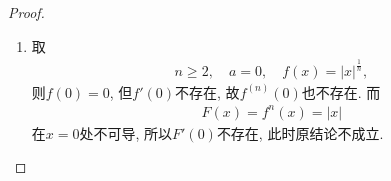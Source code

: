 \documentclass[../../main.tex]{subfiles}%
\begin{document}
\begin{proof}
\begin{enumerate}[(1)]
{\color{blue}证法二:} 由\hyperref[theorem:带各种余项的Taylor公式]{带Peano余项的Taylor公式}, 将$f$在$a$处展开得
\begin{align*}
f(x) = f'(a) (x-a) + o(x-a),\quad x\to a.
\end{align*}
从而存在$M,\delta>0$, 使得当$|x-a|<\delta$时, 有
\begin{align}
|f(x)| \leqslant M|x-a| \implies |F(x)| = |f(x)|^n \leqslant M^n |x-a|^n.
\label{eq:f_bound_310}
\end{align}
再由\hyperref[theorem:带各种余项的Taylor公式]{带Peano余项的Taylor公式}, 将$F$在$a$处展开到$n-1$阶得
\begin{align}
F(x) = \sum\limits_{i=0}^{n-1} \frac{F^{(i)}(a)}{i!} (x-a)^i + o\left((x-a)^{n-1}\right),\quad x\to a.
\label{eq:taylor_F_311}
\end{align}
假设$F'(a),\cdots,F^{(n-1)}(a)$中至少有一个不为$0$, 取
$k_0 \triangleq \min\left\{ k\in \{0,1,\cdots,n-1\} \mid F^{(k)}(a) \ne 0 \right\}$,
则$F^{(k_0)}(a) \ne 0$. 再结合\eqref{eq:taylor_F_311}式知
\begin{align*}
F(x) = \sum\limits_{i=k_0}^{n-1} \frac{F^{(i)}(a)}{i!} (x-a)^i + o\left((x-a)^{n-1}\right) = \frac{F^{(k_0)}(a)}{k_0!} (x-a)^{k_0} + o\left((x-a)^{k_0}\right),\quad x\to a.
\end{align*}
于是
\begin{align*}
\lim\limits_{x\to a} \frac{F(x)}{(x-a)^{k_0}} = \frac{F^{(k_0)}(a)}{k_0!} \ne 0.
\end{align*}
但由\eqref{eq:f_bound_310}式知
\begin{align*}
\lim\limits_{x\to a} \frac{F(x)}{(x-a)^{k_0}} \leqslant \lim\limits_{x\to a} M^n |x-a|^{n-k_0} = 0,
\end{align*}
矛盾! 故结论成立.

\item 取
\begin{align*}
n\geqslant 2,\quad a=0,\quad f(x)=|x|^{\frac{1}{n}},
\end{align*}
则$f(0)=0$, 但$f'(0)$不存在, 故$f^{(n)}(0)$也不存在. 而
\begin{align*}
F(x)=f^n(x)=|x|
\end{align*}
在$x=0$处不可导, 所以$F'(0)$不存在, 此时原结论不成立.
\end{enumerate}
\end{proof}
\end{document}
